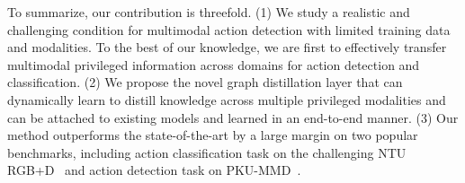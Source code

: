 To summarize, our contribution is threefold. 
(1) We study a realistic and challenging condition for multimodal action detection with limited training data and modalities. To the best of our knowledge, we are first to effectively transfer multimodal privileged information across domains for action detection and classification.
(2) We propose the novel graph distillation layer that can dynamically learn to distill knowledge across multiple privileged modalities and can be attached to existing models and learned in an end-to-end manner.
(3) Our method outperforms the state-of-the-art by a large margin on two popular benchmarks, including action classification task on the challenging NTU RGB+D~\cite{ntu_rgbd} and action detection task on PKU-MMD~\cite{pku_mmd}.
